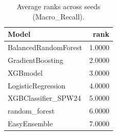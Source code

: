 \begin{table}[t]
\centering
\begin{tabular}{lr}
\toprule
Model & rank \\
\midrule
BalancedRandomForest & 1.0000 \\
GradientBoosting & 2.0000 \\
XGBmodel & 3.0000 \\
LogisticRegression & 4.0000 \\
XGBClassifier_SPW24 & 5.0000 \\
random_forest & 6.0000 \\
EasyEnsemble & 7.0000 \\
\bottomrule
\end{tabular}
\caption{Average ranks across seeds (Macro_Recall).}
\label{tab:avg_rank_Macro_Recall}
\end{table}